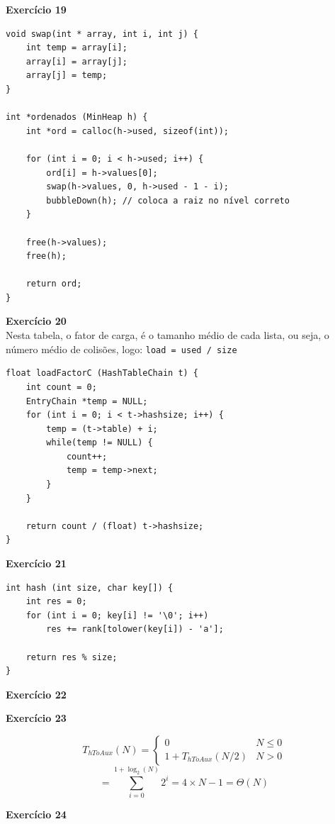 \documentclass[a4paper,11pt]{article}
\begin{document}
\newpage

\noindent \textbf{Exercício 19}

\begin{verbatim}
void swap(int * array, int i, int j) {
	int temp = array[i];
	array[i] = array[j];
	array[j] = temp;
}

int *ordenados (MinHeap h) {
	int *ord = calloc(h->used, sizeof(int));
	
	for (int i = 0; i < h->used; i++) {
		ord[i] = h->values[0];
		swap(h->values, 0, h->used - 1 - i);
		bubbleDown(h); // coloca a raiz no nível correto
	}
	
	free(h->values);
	free(h);
	
	return ord;
}
\end{verbatim}

\noindent \textbf{Exercício 20}\\

\noindent Nesta tabela, o fator de carga, é o tamanho médio de cada lista, ou seja, o número médio de colisões, logo: \texttt{load = used / size}

\begin{verbatim}
float loadFactorC (HashTableChain t) {
	int count = 0;
	EntryChain *temp = NULL;
	for (int i = 0; i < t->hashsize; i++) {
		temp = (t->table) + i;
		while(temp != NULL) {
			count++;
			temp = temp->next;
		}
	}
	
	return count / (float) t->hashsize;
}
\end{verbatim}

\noindent \textbf{Exercício 21}

\begin{verbatim}
int hash (int size, char key[]) {
	int res = 0;
	for (int i = 0; key[i] != '\0'; i++)
		res += rank[tolower(key[i]) - 'a'];
	
	return res % size;
}
\end{verbatim}


\noindent \textbf{Exercício 22}



\noindent \textbf{Exercício 23}

\[
	T_{hToAux}(N) =
	\begin{cases}
		0 & N \leq 0 \\
		1 + T_{hToAux}(N/2) & N > 0
	\end{cases}
\]
\[
	= \sum_{i=0}^{1+\log_2(N)} 2^i = 4 \times N - 1 = \Theta(N)
\]

\noindent \textbf{Exercício 24}
\end{document}
